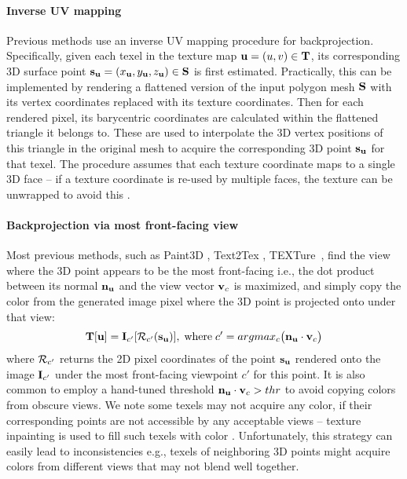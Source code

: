 \paragraph{Inverse UV mapping}
Previous methods use an inverse UV mapping procedure for backprojection. 
Specifically, given each texel in the texture map $\mathbf{u}=(u,v) \in \mathbf{T}$, its corresponding 3D surface point $\mathbf{s}_{\mathbf{u}}=(x_{\mathbf{u}},y_{\mathbf{u}},z_{\mathbf{u}}) \in \mathbf{S}$ is first estimated. Practically, this can be implemented by rendering a flattened version of the input polygon mesh $\mathbf{S}$ with its vertex coordinates replaced with its texture coordinates. Then for each rendered pixel, its barycentric coordinates are calculated within the flattened triangle it belongs to. These are used to interpolate the 3D vertex positions of this triangle in the original mesh to acquire the corresponding 3D point $\mathbf{s}_{\mathbf{u}}$ for that texel. 
The procedure assumes that each texture coordinate maps to a single 3D face -- if a texture coordinate is re-used by multiple faces, the texture can be unwrapped to avoid this \cite{Levy:2002:LSCM}. 


\paragraph{Backprojection via most front-facing view}
Most previous methods, such as Paint3D \cite{Zeng:2024:Paint3D}, Text2Tex \cite{Chen:2023:Text2tex}, 
TEXTure~\cite{Richardson:2023:Texture}, 
 find the view where the 3D point appears to be the most front-facing i.e., the dot product between its normal $\mathbf{n}_{\mathbf{u}}$ and the view vector $\mathbf{v}_c$ is maximized,  and simply copy the color from the generated image pixel where the 3D point is projected onto under that view:
\begin{equation}
 \mathbf{T}[\mathbf{u}] = \mathbf{I}_{c'}[ \mathcal{R}_{c'}( \mathbf{s}_{\mathbf{u}} ) ], \;    \text{where}  \;
 c' = argmax_c \big( \mathbf{n}_{\mathbf{u}} \cdot \mathbf{v}_c \big)
\label{eq:backprojection_paint3d}
\end{equation}
where $\mathcal{R}_{c'}$ returns the 2D pixel coordinates of the point $\mathbf{s}_{\mathbf{u}}$ rendered onto the image $\mathbf{I}_{c'}$ under the most front-facing viewpoint $c'$ for this point. It is also common to employ a hand-tuned threshold 
$\mathbf{n}_{\mathbf{u}} \cdot \mathbf{v}_c > thr$ to avoid copying colors from  obscure views. We note some texels may not acquire any color, if their corresponding points are not accessible by any acceptable views -- texture inpainting is used to fill such texels with color \cite{Zeng:2024:Paint3D}. Unfortunately, this strategy can easily lead to inconsistencies e.g., texels of neighboring 3D points might acquire colors from different views that may not blend well together. 

